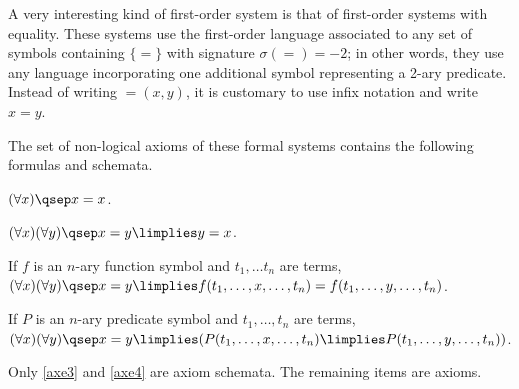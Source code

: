 \begin{example}
\label{exfofs}
\begin{parlist}
\item A very interesting kind of first-order system is that of first-order systems with equality. These systems use the first-order language associated to any set of symbols containing $\{=\}$ with signature $\sigma(=) = -2$; in other words, they use any language incorporating one additional symbol representing a 2-ary predicate. Instead of writing ${=}(x,y)$, it is customary to use infix notation and write $x=y$.

The set of non-logical axioms of these formal systems contains the following formulas and schemata.
\begin{axioms}[E]
\item $(\forall x)\qsep x = x$. \label{axe1}
\item $(\forall x)(\forall y)\qsep x = y \limplies y = x$. \label{axe2}
\item If $f$ is an $n$-ary function symbol and $t_1,\ldots t_n$ are terms, $(\forall x)(\forall y)\qsep x = y \limplies f(t_1,\ldots,x,\ldots,t_n) = f(t_1,\ldots,y,\ldots,t_n)$. \label{axe3}
\item If $P$ is an $n$-ary predicate symbol and $t_1,\ldots,t_n$ are terms, $(\forall x)(\forall y)\qsep x = y \limplies (P(t_1,\ldots,x,\ldots,t_n) \limplies P(t_1,\ldots,y,\ldots,t_n))$. \label{axe4}
\end{axioms}
Only \ref{axe3} and \ref{axe4} are axiom schemata. The remaining items are axioms.


\end{parlist}
\end{example}
